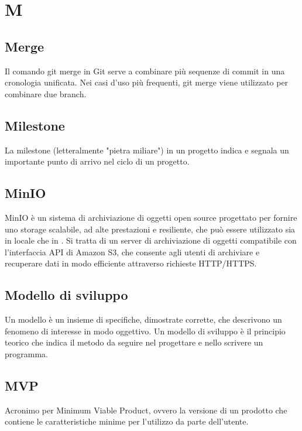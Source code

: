 \chapter{M}

\section{Merge}
Il comando git merge in Git serve a combinare più sequenze di commit in una cronologia unificata. Nei casi d’uso più frequenti, git merge viene utilizzato per combinare due branch.

\section{Milestone}
La milestone (letteralmente "pietra miliare") in un progetto indica e segnala un importante punto di arrivo nel ciclo di un progetto.

\section{MinIO}
MinIO è un sistema di archiviazione di oggetti open source progettato per fornire uno storage scalabile, ad alte prestazioni e resiliente, che può essere utilizzato sia in locale che in . Si tratta di un server di archiviazione di oggetti compatibile con l'interfaccia API di Amazon S3, che consente agli utenti di archiviare e recuperare dati in modo efficiente attraverso richieste HTTP/HTTPS.

\section{Modello di sviluppo}\label{sec:Modelli di sviluppo}
Un modello è un insieme di specifiche, dimostrate corrette, che descrivono un fenomeno di interesse in modo oggettivo. Un modello di sviluppo è il principio teorico che indica il metodo da seguire nel progettare e nello scrivere un programma.

\section{MVP}\label{sec:Minimum Viable Product}
Acronimo per Minimum Viable Product, ovvero la versione di un prodotto che contiene le caratteristiche minime per l'utilizzo da parte dell'utente.
